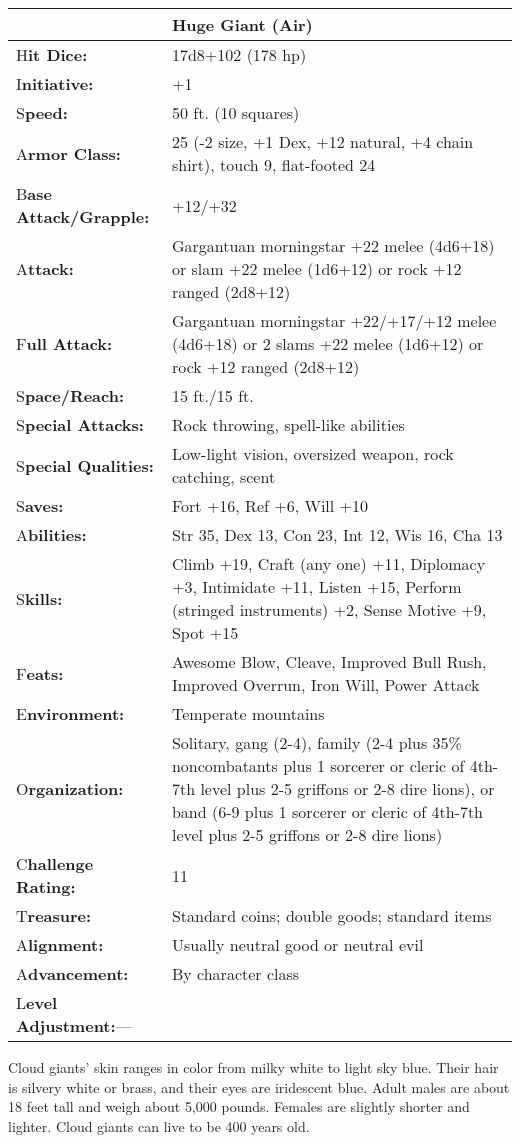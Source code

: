 \documentclass{article}
\begin{document}
\begin{tabular}{|>{\raggedright}p{77pt}|>{\raggedright}p{248pt}|}
\hline
  & Huge Giant (Air)\tabularnewline
\hline
H\textbf{it Dice:} & 17d8+102 (178 hp)\tabularnewline
\hline
I\textbf{nitiative:} & +1\tabularnewline
\hline
S\textbf{peed:} & 50 ft. (10 squares)\tabularnewline
\hline
A\textbf{rmor Class:} & 25 (-2 size, +1 Dex, +12 natural, +4 chain shirt), touch 
9, flat-footed 24\tabularnewline
\hline
B\textbf{ase Attack/Grapple:} & +12/+32\tabularnewline
\hline
A\textbf{ttack:} & Gargantuan morningstar +22 melee (4d6+18) or slam +22 melee 
(1d6+12) or rock +12 ranged (2d8+12)\tabularnewline
\hline
F\textbf{ull Attack:} & Gargantuan morningstar +22/+17/+12 melee (4d6+18) or 2 
slams +22 melee (1d6+12) or rock +12 ranged (2d8+12)\tabularnewline
\hline
S\textbf{pace/Reach:} & 15 ft./15 ft.\tabularnewline
\hline
S\textbf{pecial Attacks:} & Rock throwing, spell-like abilities\tabularnewline
\hline
S\textbf{pecial Qualities:} & Low-light vision, oversized weapon, rock catching, 
scent\tabularnewline
\hline
S\textbf{aves:} & Fort +16, Ref +6, Will +10\tabularnewline
\hline
A\textbf{bilities:} & Str 35, Dex 13, Con 23, Int 12, Wis 16, Cha 13\tabularnewline
\hline
S\textbf{kills:} & Climb +19, Craft (any one) +11, Diplomacy +3, Intimidate +11, 
Listen +15, Perform (stringed instruments) +2, Sense Motive +9, Spot +15 \tabularnewline
\hline
F\textbf{eats:} & Awesome Blow, Cleave, Improved Bull Rush, Improved Overrun, Iron 
Will, Power Attack\tabularnewline
\hline
E\textbf{nvironment:} & Temperate mountains\tabularnewline
\hline
O\textbf{rganization:} & Solitary, gang (2-4), family (2-4 plus 35\% noncombatants 
plus 1 sorcerer or cleric of 4th-7th level plus 2-5 griffons or 2-8 dire lions), 
or band (6-9 plus 1 sorcerer or cleric of 4th-7th level plus 2-5 griffons or 2-8 
dire lions) \tabularnewline
\hline
C\textbf{hallenge Rating:} & 11\tabularnewline
\hline
T\textbf{reasure:} & Standard coins; double goods; standard items\tabularnewline
\hline
A\textbf{lignment:} & Usually neutral good or neutral evil\tabularnewline
\hline
A\textbf{dvancement:} & By character class\tabularnewline
\hline
L\textbf{evel Adjustment:}--- & \tabularnewline
\hline
\end{tabular}

Cloud giants' skin ranges in color from milky white to light sky blue. Their hair 
is silvery white or brass, and their eyes are iridescent blue. Adult males are 
about 18 feet tall and weigh about 5,000 pounds. Females are slightly shorter and 
lighter. Cloud giants can live to be 400 years old.
\end{document}
